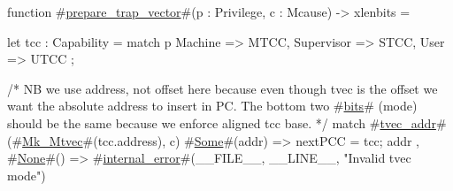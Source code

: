 function #\hyperref[sailRISCVzpreparezytrapzyvector]{prepare\_trap\_vector}#(p : Privilege, c : Mcause) -> xlenbits = {
  let tcc : Capability = match p {
                           Machine    => MTCC,
                           Supervisor => STCC,
                           User       => UTCC
                         };

  /* NB we use address, not offset here because even though tvec is the offset
     we want the absolute address to insert in PC. The bottom two #\hyperref[sailRISCVzbits]{bits}# (mode) should
     be the same because we enforce aligned tcc base. */
  match #\hyperref[sailRISCVztveczyaddr]{tvec\_addr}#(#\hyperref[sailRISCVzMkzyMtvec]{Mk\_Mtvec}#(tcc.address), c) {
    #\hyperref[sailRISCVzSome]{Some}#(addr) => { nextPCC = tcc; addr },
    #\hyperref[sailRISCVzNone]{None}#()     => #\hyperref[sailRISCVzinternalzyerror]{internal\_error}#(__FILE__, __LINE__, "Invalid tvec mode")
  }
}
